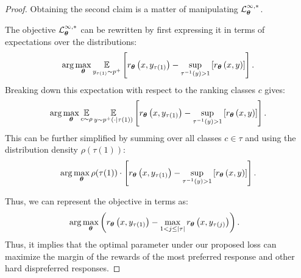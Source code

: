 \begin{proof}
Obtaining the second claim is a matter of manipulating $\mathcal{L}_{{\boldsymbol{\theta}}}^{\infty,*}$. 



The objective $\mathcal{L}_{{\boldsymbol{\theta}}}^{\infty,*}$ can be rewritten by first expressing it in terms of expectations over the distributions:
\[\arg\max\limits_{{\boldsymbol{\theta}}}\operatorname*{\mathbb{E}}\limits_{y_{\tau(1)}\sim p^{+}}\left[r_{{\boldsymbol{\theta}}}\left(x,y_{\tau(1)}\right)-\sup\limits_{\tau^{-1}(y)>1}\left[r_{{\boldsymbol{\theta}}}\left(x,y\right)\right]\right].\]
Breaking down this expectation with respect to the ranking classes $c$ gives:
\[\arg\max\limits_{{\boldsymbol{\theta}}}\operatorname*{\mathbb{E}}_{c\sim\rho}\operatorname*{\mathbb{E}}\limits_{y\sim p^{+}(\cdot|\tau(1))}\left[r_{{\boldsymbol{\theta}}}\left(x,y_{\tau(1)}\right)-\sup\limits_{\tau^{-1}(y)>1}\left[r_{{\boldsymbol{\theta}}}\left(x,y\right)\right]\right].\]
This can be further simplified by summing over all classes $c\in\mathcal{\tau}$ and using the distribution density $\rho(\tau(1))$:
\[\arg\max\limits_{{\boldsymbol{\theta}}}\rho(\tau(1))\cdot\left[r_{{\boldsymbol{\theta}}}\left(x,y_{\tau(1)}\right)-\sup\limits_{\tau^{-1}(y)>1}\left[r_{{\boldsymbol{\theta}}}\left(x,y\right)\right]\right].\]

Thus, we can represent the objective in terms as:
\begin{equation*}
\begin{aligned}
&\arg\max\limits_{{\boldsymbol{\theta}}}\left(r_{{\boldsymbol{\theta}}}\left(x,y_{\tau(1)}\right)-\max\limits_{1<j\leq |\tau|}r_{{\boldsymbol{\theta}}}\left(x,y_{\tau(j)}\right)\right).
\end{aligned}
\end{equation*}
Thus, it implies that the optimal parameter under our proposed  loss can maximize the margin of the rewards of the most preferred response and other hard dispreferred responses.

\end{proof}


